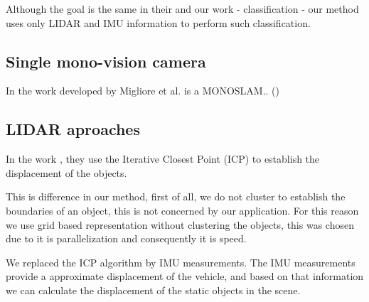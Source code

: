 Although the goal is the same in their and our work - classification - our method uses only LIDAR and IMU information to perform such classification.

\subsection{Single mono-vision camera}

In the work developed by Migliore et al. \cite{Migliore_2009_ICRA} is a MONOSLAM..  ()

\subsection{LIDAR aproaches}

In the work \cite{4650636}, they use the Iterative Closest Point (ICP) \cite{10.1109/34.121791} to establish the displacement of the objects. 

This is difference in our method, first of all, we do not cluster to establish the boundaries of an object, this is not concerned by our application. For this reason we use grid based representation without clustering the objects, this was chosen due to it is parallelization and consequently it is speed.

We replaced the ICP algorithm by IMU measurements. The IMU measurements provide a approximate displacement of the vehicle, and based on that information we can calculate the displacement of the static objects in the scene.  
